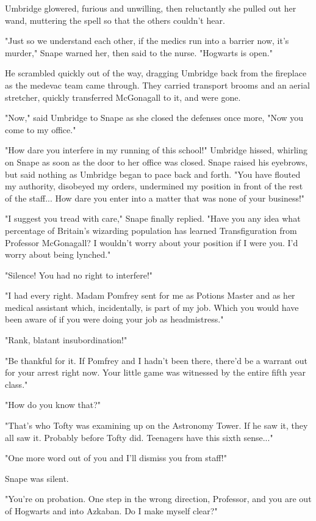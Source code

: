 \documentclass[a4paper,11pt]{article}
\begin{document}
Umbridge glowered, furious and unwilling, then reluctantly she pulled out her wand, muttering the spell so that the others couldn't hear.

"Just so we understand each other, if the medics run into a barrier now, it's murder," Snape warned her, then said to the nurse. "Hogwarts is open."

He scrambled quickly out of the way, dragging Umbridge back from the fireplace as the medevac team came through. They carried transport brooms and an aerial stretcher, quickly transferred McGonagall to it, and were gone.

"Now," said Umbridge to Snape as she closed the defenses once more, "Now you come to my office."

"How dare you interfere in my running of this school!" Umbridge hissed, whirling on Snape as soon as the door to her office was closed. Snape raised his eyebrows, but said nothing as Umbridge began to pace back and forth. "You have flouted my authority, disobeyed my orders, undermined my position in front of the rest of the staff... How dare you enter into a matter that was none of your business!"

"I suggest you tread with care," Snape finally replied. "Have you any idea what percentage of Britain's wizarding population has learned Transfiguration from Professor McGonagall? I wouldn't worry about your position if I were you. I'd worry about being lynched."

"Silence! You had no right to interfere!"

"I had every right. Madam Pomfrey sent for me as Potions Master and as her medical assistant which, incidentally, is part of my job. Which you would have been aware of if you were doing your job as headmistress."

"Rank, blatant insubordination!"

"Be thankful for it. If Pomfrey and I hadn't been there, there'd be a warrant out for your arrest right now. Your little game was witnessed by the entire fifth year class."

"How do you know that?"

"That's who Tofty was examining up on the Astronomy Tower. If he saw it, they all saw it. Probably before Tofty did. Teenagers have this sixth sense..."

"One more word out of you and I'll dismiss you from staff!"

Snape was silent.

"You're on probation. One step in the wrong direction, Professor, and you are out of Hogwarts and into Azkaban. Do I make myself clear?"
\end{document}
